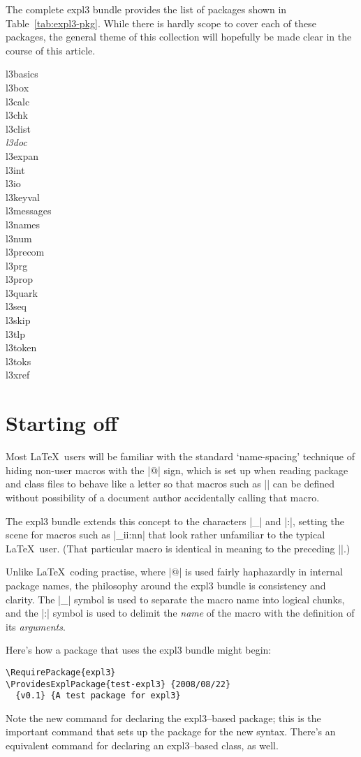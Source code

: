 \documentclass{ltugboat}
\def\pkg#1{\textsf{#1}}
\begin{document}
The complete \pkg{expl3} bundle provides the list of packages shown in
Table~\ref{tab:expl3-pkg}. While there is hardly scope to cover each of these
packages, the general theme of this collection will hopefully be made clear in
the course of this article.

\begin{table}
\caption{Packages provided by \pkg{expl3}; emphasised \emph{\pkg{l3doc}} is
the class used to document \pkg{expl3}-related packages.}
\label{tab:expl3-pkg}
\begin{multicols}{4}
\small\sffamily\centering
\begin{obeylines}
l3basics
l3box
l3calc
l3chk
l3clist
\emph{l3doc}
l3expan
l3int
l3io
l3keyval
l3messages
l3names
l3num
l3precom
l3prg
l3prop
l3quark
l3seq
l3skip
l3tlp
l3token
l3toks
l3xref
\end{obeylines}
\end{multicols}
\end{table}

\section{Starting off} 

Most \LaTeX\ users will be familiar with the standard `name-spacing' technique
of hiding non-user macros with the |@| sign, which is set up when reading
package and class files to behave like a letter so that macros such as
|\@secondoftwo| can be defined without possibility of a document author
accidentally calling that macro.

The \pkg{expl3} bundle extends this concept to the characters |_| and |:|,
setting the scene for macros such as |\use_ii:nn| that look rather
unfamiliar to the typical \LaTeX\ user. (That particular macro is identical in
meaning to the preceding |\@secondoftwo|.)

Unlike \LaTeX\ coding practise, where |@| is used fairly haphazardly in
internal package names, the philosophy around the \pkg{expl3} bundle is
consistency and clarity. The |_| symbol is used to separate the macro name
into logical chunks, and the |:| symbol is used to delimit the \emph{name} of
the macro with the definition of its \emph{arguments}.

Here's how a package that uses the \pkg{expl3} bundle might begin:
\begin{lstlisting}
\RequirePackage{expl3}
\ProvidesExplPackage{test-expl3} {2008/08/22}
  {v0.1} {A test package for expl3}
\end{lstlisting}
Note the new command for declaring the \pkg{expl3}--based package; this is the
important command that sets up the package for the new syntax. There's an
equivalent command for declaring an \pkg{expl3}--based class, as well.
\end{document}
